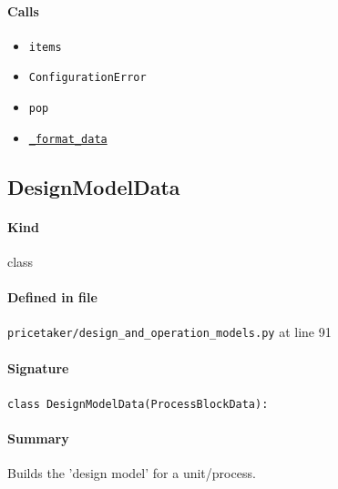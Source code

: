 \documentclass[11pt]{report}
\begin{document}
\paragraph{Calls}
\begin{itemize}[leftmargin=*]
  \item \texttt{items}
  \item \texttt{ConfigurationError}
  \item \texttt{pop}
  \item \hyperref[def:pricetaker-design_and_operation_models.py:_format_data:L30]{\texttt{\_format\_data}}
\end{itemize}
\subsection{DesignModelData}
\label{def:pricetaker-design_and_operation_models.py:DesignModelData:L91}
\paragraph{Kind} class
\paragraph{Defined in file} \texttt{pricetaker/design\_and\_operation\_models.py} at line 91
\paragraph{Signature} \texttt{class DesignModelData(ProcessBlockData):}
\paragraph{Summary} Builds the 'design model' for a unit/process.
\end{document}
